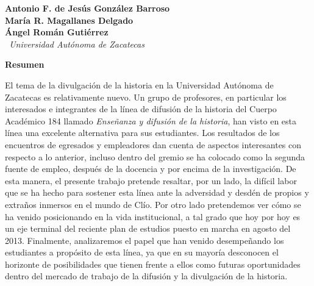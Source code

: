 \thispagestyle{empty}

{}
\setcounter{footnote}{0}


\bigskip
\begin{center}
{\bfseries Antonio F. de Jesús González Barroso\\
María R. Magallanes Delgado\\
Ángel Román Gutiérrez}\\
{\itshape\ Universidad Autónoma de Zacatecas\/}
\end{center}

\bigskip
\textbf{Resumen}

El tema de la divulgación de la historia en la Universidad Autónoma de 
Zacatecas es relativamente nuevo. Un grupo de profesores, en particular 
los interesados e integrantes de la línea de difusión de la historia 
del Cuerpo Académico 184 llamado \textit{Enseñanza y difusión de la 
historia},  han visto en esta línea una excelente alternativa para sus 
estudiantes. Los resultados de los encuentros de egresados y 
empleadores dan cuenta de aspectos interesantes con respecto a lo 
anterior, incluso dentro del gremio se ha colocado como la segunda 
fuente de empleo, después de la docencia y por encima de la 
investigación. De esta manera, el presente trabajo pretende resaltar, 
por un lado, la difícil labor que se ha hecho para sostener esta línea 
ante la adversidad y desdén de propios y extraños inmersos en el mundo de 
Clío. Por otro lado pretendemos ver cómo se ha venido posicionando en 
la vida institucional, a tal grado que hoy por hoy es un eje terminal 
del reciente plan de estudios puesto en marcha en agosto del 2013. 
Finalmente, analizaremos el papel que han venido desempeñando los estudiantes 
a propósito de esta línea, ya que en su mayoría desconocen el horizonte 
de posibilidades que tienen frente a ellos como futuras oportunidades 
dentro del mercado de trabajo de la difusión y la divulgación de la 
historia.


